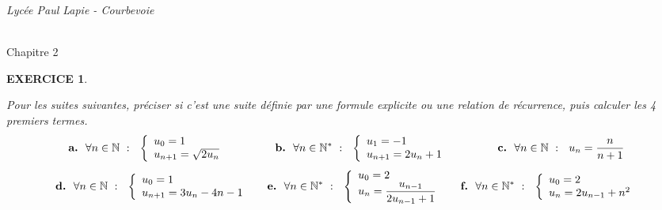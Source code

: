 \documentclass[a4paper]{article}   %
\renewcommand{\(}{\left(}
\renewcommand{\)}{\right)}
\newtheorem{EXO}{\large EXERCICE }
\newenvironment{EX}   { \setcounter{ques}{0} \begin{EXO} \hrulefill ~\vspace{0.3cm}

\normalfont}    {\end{EXO} \medskip}
\newcommand{\f}{\dfrac} 	%
\def\cl{{\large \bf{1èreG1}}}
\begin{document}
\newpage

\noindent\begin{minipage}{.20\linewidth}\begin{center}                  
\noindent \emph{Lycée Paul Lapie - Courbevoie}
\end{center}\end{minipage}
\begin{minipage}{1.5\linewidth}\begin{center}	
\noindent \cl\\ Chapitre 2
\end{center}\end{minipage}

\begin{center} 	
\end{center}

\begin{EX} Pour les suites suivantes, préciser si c'est une suite définie par une formule explicite ou une relation de récurrence, puis calculer les 4 premiers termes. 
$$ \textbf{a.} ~~\forall n \in \mathbb{N}~:~~\left \{ \begin{array}{l}
u_0=1		 \\           			
u_{n+1}=\sqrt{2u_n}		 
\end{array} \right. \hspace{1.5cm}  
\textbf{b.} ~~\forall n \in \mathbb{N}^*~:~~\left \{ \begin{array}{l}
u_1=-1		 \\           			
u_{n+1}=2u_n+1		 
\end{array} \right. \hspace{1.5cm}  
\textbf{c.} ~~\forall n \in \mathbb{N}~:~~u_n=\f{n}{n+1}  $$  
$$ \textbf{d.} ~~\forall n \in \mathbb{N}~:~~\left \{ \begin{array}{l}
u_0=1		 \\           			
u_{n+1}=3u_n-4n-1		 
\end{array} \right. \hspace{0.5cm}  
\textbf{e.} ~~\forall n \in \mathbb{N}^*~:~~\left \{ \begin{array}{l}
u_0=2		 \\           			
u_{n}=\f{u_{n-1}}{	2u_{n-1}+1}	 
\end{array} \right.  \hspace{0.5cm} 
\textbf{f.} ~~\forall n \in \mathbb{N}^*~:~~\left \{ \begin{array}{l}
u_0=2		 \\           			
u_{n}=2u_{n-1}+n^2 	 
\end{array} \right. $$

\end{EX}
\end{document}
